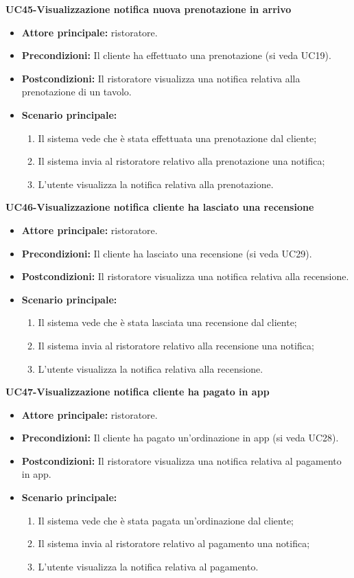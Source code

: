 \textbf{UC45-Visualizzazione notifica nuova prenotazione in arrivo}
\begin{itemize}
\item \textbf{Attore principale:} ristoratore.
\item \textbf{Precondizioni:} Il cliente ha effettuato una prenotazione (si veda UC19).
\item \textbf{Postcondizioni:} Il ristoratore visualizza una notifica relativa alla prenotazione di un tavolo.
\item \textbf{Scenario principale:}
\begin{enumerate}
    \item Il sistema vede che è stata effettuata una prenotazione dal cliente;
    \item Il sistema invia al ristoratore relativo alla prenotazione una notifica;
    \item L'utente visualizza la notifica relativa alla prenotazione.
\end{enumerate}
\end{itemize}

\textbf{UC46-Visualizzazione notifica cliente ha lasciato una recensione}
\begin{itemize}
\item \textbf{Attore principale:} ristoratore.
\item \textbf{Precondizioni:} Il cliente ha lasciato una recensione (si veda UC29).
\item \textbf{Postcondizioni:} Il ristoratore visualizza una notifica relativa alla recensione.
\item \textbf{Scenario principale:}
\begin{enumerate}
    \item Il sistema vede che è stata lasciata una recensione dal cliente;
    \item Il sistema invia al ristoratore relativo alla recensione una notifica;
    \item L'utente visualizza la notifica relativa alla recensione.
\end{enumerate}
\end{itemize}

\textbf{UC47-Visualizzazione notifica cliente ha pagato in app}
\begin{itemize}
\item \textbf{Attore principale:} ristoratore.
\item \textbf{Precondizioni:} Il cliente ha pagato un'ordinazione in app (si veda UC28).
\item \textbf{Postcondizioni:} Il ristoratore visualizza una notifica relativa al pagamento in app.
\item \textbf{Scenario principale:}
\begin{enumerate}
    \item Il sistema vede che è stata pagata un'ordinazione dal cliente;
    \item Il sistema invia al ristoratore relativo al pagamento una notifica;
    \item L'utente visualizza la notifica relativa al pagamento.
\end{enumerate}
\end{itemize}


